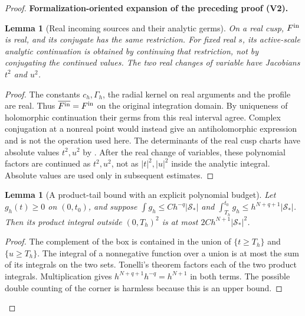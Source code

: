 \documentclass[11pt]{article}
\newtheorem{lemma}[theorem]{Lemma}
\newcommand{\formalisationparentid}{X}
\newenvironment{formalisationaddition}[1]{\par\medskip\begingroup\color{blue}\def\formalisationparentid{#1}\setcounter{formalizationsublemma}{0}\let\lemma\formalizationsublemma\let\endlemma\endformalizationsublemma
  \def\Eo{\mathcal E_h^\circ}\def\EE{\mathcal E_h}\def\phio{\phi_h^\circ}\def\phih{\phi_h}\def\Ho{H_h^{\rm atom}(v^\circ)}\def\Ha{H_h^{\rm atom}}\def\HL{H_h^{L}}\def\Dh{D_h}\def\Log{\operatorname{Log}}\def\ellh{\ell_h}\def\Gp{G_{p,h}}\def\Ast{A_{*,h}}\def\ahat{\widehat{\mathfrak a}_h}\def\ah{\mathfrak a_h}\def\rh{\widehat\rho_h}\def\deltah{\widehat\delta_h}\def\oldref##1{\textup{(##1)}}\def\interface##1{\par\noindent\textit{Analytical interface used here.} ##1\par}\def\finish{\par\noindent\textit{Conclusion of the formalization-oriented expansion.} }\par\noindent\textbf{Formalization-oriented expansion of the preceding proof (V2).}\par\smallskip
}{\par\endgroup\medskip
}
\begin{document}
\begin{proof}
\begin{formalisationaddition}{P6.7}
\begin{lemma}[Real incoming sources and their analytic germs]\label{sublemma:P6-7-real-germ}
On a real cusp, $F^{\rm in}$ is real, and its conjugate has the same
restriction. For fixed real $s$, its active-scale analytic continuation
is obtained by continuing that restriction, not by conjugating the
continued values. The two real changes of variable have Jacobians
$t^2$ and $u^2$.
\end{lemma}
\begin{proof}
The constants $c_h,\Gamma_h$, the radial kernel on real arguments and
the profile are real. Thus $\overline{F^{\rm in}}=F^{\rm in}$ on the
original integration domain. By uniqueness of holomorphic continuation
their germs from this real interval agree. Complex conjugation at a
nonreal point would instead give an antiholomorphic expression and is
not the operation used here. The determinants of the real cusp charts
have absolute values $t^2,u^2$ by .
After the real change of variables, these polynomial factors are
continued as $t^2,u^2$, not as $|t|^2,|u|^2$ inside the analytic integral.
Absolute values are used only in subsequent estimates.
\end{proof}

\begin{lemma}[A product-tail bound with an explicit polynomial budget]\label{sublemma:P6-7-product-tail}
Let $g_h(t)\ge0$ on $(0,t_0)$, and suppose
$\int g_h\le C h^{-q}|\mathcal S_*|$ and
$\int_{T_h}^{t_0}g_h\le h^{N+q+1}|\mathcal S_*|$.
Then its product integral outside $(0,T_h)^2$ is at most
$2C h^{N+1}|\mathcal S_*|^2$.
\end{lemma}
\begin{proof}
The complement of the box is contained in the union of
$\{t\ge T_h\}$ and $\{u\ge T_h\}$.
The integral of a nonnegative function over a union is at most the sum
of its integrals on the two sets. Tonelli's theorem factors each of
the two product integrals. Multiplication gives
$h^{N+q+1}h^{-q}=h^{N+1}$ in both terms. The possible double counting
of the corner is harmless because this is an upper bound.
\end{proof}


\end{formalisationaddition}
\end{proof}
\end{document}
